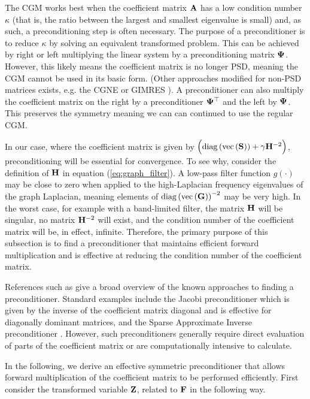 The CGM works best when the coefficient matrix $\mathbf{A}$ has a low condition number $\kappa$ (that is, the ratio between the largest and smallest eigenvalue is small) and, as such, a preconditioning step is often necessary. The purpose of a preconditioner is to reduce $\kappa$ by solving an equivalent transformed problem. This can be achieved by right or left multiplying the linear system by a preconditioning matrix $\mathbf{\Psi}$. However, this likely means the coefficient matrix is no longer PSD, meaning the CGM cannot be used in its basic form. (Other approaches modified for non-PSD matrices exists, e.g. the CGNE or GIMRES \citep{Elman1982, Saad1986}). A preconditioner can also multiply the coefficient matrix on the right by a preconditioner $\mathbf{\Psi}^\top$ and the left by $\mathbf{\Psi}$. This preserves the symmetry meaning we can can continued to use the regular CGM. 

In our case, where the coefficient matrix is given by $\Big(\text{\textup{diag}}\left(\text{\textup{vec}}\left(\mathbf{S}\right)\right) + \gamma  \mathbf{H}^{-2}\Big)$, preconditioning will be essential for convergence. To see why, consider the definition of $\mathbf{H}$ in equation (\ref{eq:graph_filter}). A low-pass filter function $g(\cdot)$ may be close to zero when applied to the  high-Laplacian frequency eigenvalues of the graph Laplacian, meaning elements of $\text{\textup{diag}}\left(\text{\textup{vec}}\left(\mathbf{G}\right)\right)^{-2}$ may be very high. In the worst case, for example with a band-limited filter, the matrix $\mathbf{H}$ will be singular, no matrix $\mathbf{H}^{-2}$ will exist, and the condition number of the coefficient matrix will be, in effect, infinite. Therefore, the primary purpose of this subsection is to find a preconditioner that maintains efficient forward multiplication and is effective at reducing the condition number of the coefficient matrix.

References such as \citep{Saad2003} give a broad overview of the known approaches to finding a preconditioner. Standard examples include the Jacobi preconditioner which is given by the inverse of the coefficient matrix diagonal and is effective for diagonally dominant matrices, and the Sparse Approximate Inverse preconditioner \citep{Grote1997}. However, such preconditioners generally require direct evaluation of parts of the coefficient matrix or are computationally intensive to calculate.

In the following, we derive an effective symmetric preconditioner that allows forward multiplication of the coefficient matrix to be performed efficiently. First consider the transformed variable $\mathbf{Z}$, related to $\mathbf{F}$ in the following way.

